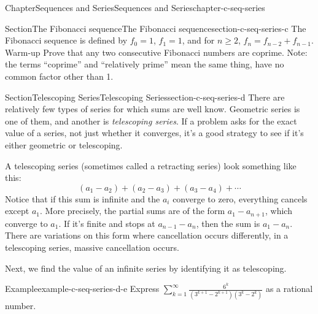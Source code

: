 \documentclass[oneside,10pt,]{book}
\numberwithin{equation}{section}
\begin{document}
%
\begin{chapterptx}{Chapter}{Sequences and Series}{}{Sequences and Series}{}{}{chapter-c-seq-series}
\renewcommand*{\chaptername}{Chapter}
\begin{introduction}{}%
%
\end{introduction}%
%
%
\typeout{************************************************}
\typeout{************************************************}
%
\begin{sectionptx}{Section}{The Fibonacci sequence}{}{The Fibonacci sequence}{}{}{section-c-seq-series-c}
%
The Fibonacci sequence is defined by  \(f_0=1\), \(f_1= 1\), and for \(n\geq 2\), \(f_n= f_{n-2}+f_{n-1}\). Warm-up  Prove that any two consecutive Fibonacci numbers are coprime.  Note:  the terms  ``coprime''  and   ``relatively prime'' mean the same thing, have no common factor other than 1.%
\end{sectionptx}
%
%
\typeout{************************************************}
\typeout{************************************************}
%
\begin{sectionptx}{Section}{Telescoping Series}{}{Telescoping Series}{}{}{section-c-seq-series-d}
There are relatively few types of series for which sums are well know.  Geometric series is one of them, and another is \emph{telescoping series}.  If a problem asks for the exact value of a series, not just whether it converges, it's a good strategy to see if it's either geometric or telescoping.%
\par
A telescoping series (sometimes called a retracting series) look something like this:%
\begin{equation*}
(a_1-a_2)+(a_2-a_3)+(a_3-a_4)+\cdots
\end{equation*}
Notice that if this sum is infinite and the \(a_i\) converge to zero, everything cancels except \(a_1\). More precisely, the partial sums are of the form \(a_1-a_{n+1}\), which converge to \(a_1\).  If it's finite and stops at \(a_{n-1}-a_n\), then the sum is \(a_{1}-a_n\).  There are variations on this form where cancellation occurs differently, in a telescoping series, massive cancellation occurs.%
\par
Next, we find the value of an infinite series by identifying it as telescoping.%
\begin{example}{Example}{}{example-c-seq-series-d-e}%
Express \(\sum _{k=1}^{\infty } \frac{6^k}{\left(3^{k+1}-2^{k+1}\right) \left(3^k-2^k\right)}\) as a rational number.%

\end{example}
\end{sectionptx}
\end{chapterptx}
\end{document}
